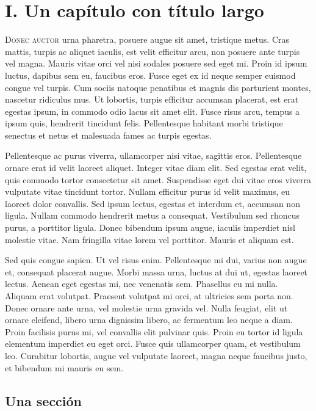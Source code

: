 \chapter*{I. Un capítulo con título largo}

\noindent\textsc{Donec auctor} urna pharetra, posuere augue sit amet, tristique metus. Cras mattis, turpis ac aliquet iaculis, est velit efficitur arcu, non posuere ante turpis vel magna. Mauris vitae orci vel nisi sodales posuere sed eget mi. Proin id ipsum luctus, dapibus sem eu, faucibus eros. Fusce eget ex id neque semper euismod congue vel turpis. Cum sociis natoque penatibus et magnis dis parturient montes, nascetur ridiculus mus. Ut lobortis, turpis efficitur accumsan placerat, est erat egestas ipsum, in commodo odio lacus sit amet elit. Fusce risus arcu, tempus a ipsum quis, hendrerit tincidunt felis. Pellentesque habitant morbi tristique senectus et netus et malesuada fames ac turpis egestas.

Pellentesque ac purus viverra, ullamcorper nisi vitae, sagittis eros. Pellentesque ornare erat id velit laoreet aliquet. Integer vitae diam elit. Sed egestas erat velit, quis commodo tortor consectetur sit amet. Suspendisse eget dui vitae eros viverra vulputate vitae tincidunt tortor. Nullam efficitur purus id velit maximus, eu laoreet dolor convallis. Sed ipsum lectus, egestas et interdum et, accumsan non ligula. Nullam commodo hendrerit metus a consequat. Vestibulum sed rhoncus purus, a porttitor ligula. Donec bibendum ipsum augue, iaculis imperdiet nisl molestie vitae. Nam fringilla vitae lorem vel porttitor. Mauris et aliquam est.

Sed quis congue sapien. Ut vel risus enim. Pellentesque mi dui, varius non augue et, consequat placerat augue. Morbi massa urna, luctus at dui ut, egestas laoreet lectus. Aenean eget egestas mi, nec venenatis sem. Phasellus eu mi nulla. Aliquam erat volutpat. Praesent volutpat mi orci, at ultricies sem porta non. Donec ornare ante urna, vel molestie urna gravida vel. Nulla feugiat, elit ut ornare eleifend, libero urna dignissim libero, ac fermentum leo neque a diam. Proin facilisis purus mi, vel convallis elit pulvinar quis. Proin eu tortor id ligula elementum imperdiet eu eget orci. Fusce quis ullamcorper quam, et vestibulum leo. Curabitur lobortis, augue vel vulputate laoreet, magna neque faucibus justo, et bibendum mi mauris eu sem.

\section*{\large Una sección}

